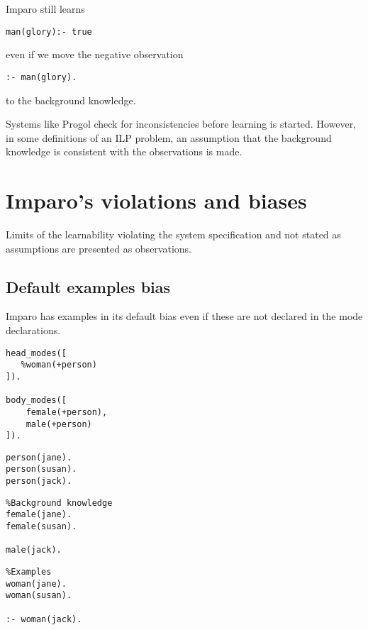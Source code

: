 Imparo still learns
\begin{lstlisting}
man(glory):- true
\end{lstlisting}
even if we move the negative observation
\begin{lstlisting}
:- man(glory).
\end{lstlisting}
to the background knowledge.

Systems like Progol check for inconsistencies before learning is started. However, in some definitions of an ILP problem, an assumption that the background knowledge is consistent with the observations is made.

\section{Imparo's violations and biases}
Limits of the learnability violating the system specification and not stated as assumptions are presented as observations.

\subsection{Default examples bias}
Imparo has examples in its default bias even if these are not declared in the mode declarations.

\begin{minipage}[t]{.25\textwidth}
\begin{lstlisting}
head_modes([
   %woman(+person)
]).

body_modes([
    female(+person),
    male(+person)
]).\end{lstlisting}
\end{minipage}
\begin{minipage}[t]{.20\textwidth}
\begin{lstlisting}
person(jane).
person(susan).
person(jack).
\end{lstlisting}
\end{minipage}
\begin{minipage}[t]{.30\textwidth}
\begin{lstlisting}
%Background knowledge
female(jane).
female(susan).

male(jack).
\end{lstlisting}
\end{minipage}
\begin{minipage}[t]{.25\textwidth}
\begin{lstlisting}
%Examples
woman(jane).
woman(susan).

:- woman(jack).
\end{lstlisting}
\end{minipage}


